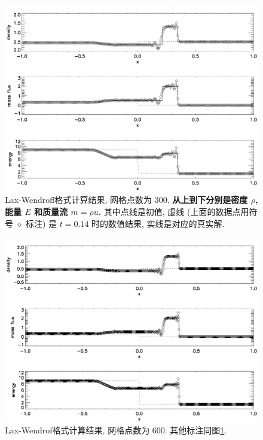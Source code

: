 \documentclass[10.5pt
]{article}
\begin{document}
\begin{figure}
\begin{center}
\includegraphics[width=.85\textwidth]{hw3_lax_300.eps}
\caption{Lax-Wendroff格式计算结果, 网格点数为 300. \textbf{从上到下分别是密度 $\rho$, 能量 $E$ 和质量流 $m = \rho u$.}
其中点线是初值, 虚线 (上面的数据点用符号 $\diamond$ 标注) 是 $t=0.14$ 时的数值结果, 实线是对应的真实解.}\label{Fig:LaxA}
\end{center}
\end{figure}

\begin{figure}
\begin{center}
\includegraphics[width=.85\textwidth]{hw3_lax_600.eps}
\caption{Lax-Wendrof格式计算结果, 网格点数为 600. 
其他标注同图\ref{Fig:LaxA}.}\label{Fig:LaxB}
\end{center}
\end{figure}
\end{document}
